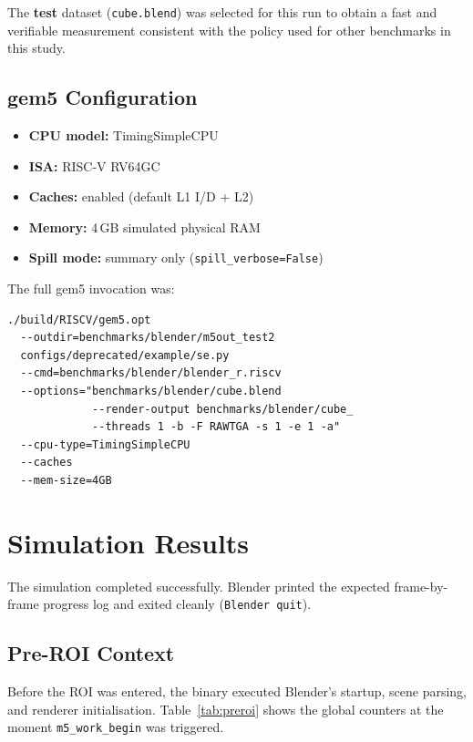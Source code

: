 \documentclass[conference]{IEEEtran}
\begin{document}
The \textbf{test} dataset (\texttt{cube.blend}) was selected for this run
to obtain a fast and verifiable measurement consistent with the policy
used for other benchmarks in this study.

\subsection{gem5 Configuration}

\begin{itemize}
    \item \textbf{CPU model:}   TimingSimpleCPU
    \item \textbf{ISA:}         RISC-V RV64GC
    \item \textbf{Caches:}      enabled (default L1 I/D + L2)
    \item \textbf{Memory:}      4\,GB simulated physical RAM
    \item \textbf{Spill mode:}  summary only (\texttt{spill\_verbose=False})
\end{itemize}

The full gem5 invocation was:

\begin{verbatim}
./build/RISCV/gem5.opt
  --outdir=benchmarks/blender/m5out_test2
  configs/deprecated/example/se.py
  --cmd=benchmarks/blender/blender_r.riscv
  --options="benchmarks/blender/cube.blend
             --render-output benchmarks/blender/cube_
             --threads 1 -b -F RAWTGA -s 1 -e 1 -a"
  --cpu-type=TimingSimpleCPU
  --caches
  --mem-size=4GB
\end{verbatim}

\section{Simulation Results}

The simulation completed successfully. Blender printed the expected
frame-by-frame progress log and exited cleanly
(\texttt{Blender quit}).

\subsection{Pre-ROI Context}

Before the ROI was entered, the binary executed Blender's startup,
scene parsing, and renderer initialisation. Table~\ref{tab:preroi}
shows the global counters at the moment \texttt{m5\_work\_begin}
was triggered.
\end{document}
